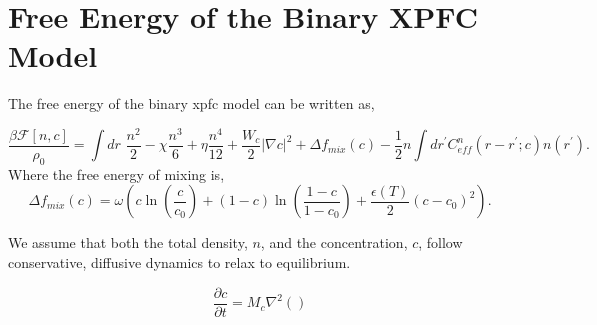 \documentclass[11pt]{article}
\begin{document}
\section*{Free Energy of the Binary XPFC Model}

The free energy of the binary xpfc model can be written as, 

\begin{equation}
\frac{\beta \mathcal{F}[n, c]}{\rho_0} = \int dr \,\, \frac{n^2}{2} - \chi\frac{n^3}{6}
 + \eta \frac{n^4}{12} + \frac{W_c}{2}\lvert\nabla c\rvert^2 + \Delta f_{mix}(c) - \frac{1}{2}n\int dr^\prime C_{eff}^n(r-r^\prime; c)n(r^\prime).
\end{equation}
Where the free energy of mixing is, 
\begin{equation}
\Delta f_{mix}(c) = \omega\left(c\ln\left(\frac{c}{c_0}\right)+(1-c)\ln\left(\frac{1-c}{1-c_0}\right) + \frac{\epsilon(T)}{2} (c-c_0)^2\right).
\end{equation}

We assume that both the total density, $n$, and the concentration, $c$, follow conservative, diffusive dynamics to relax to equilibrium. 

\begin{equation}
\frac{\partial c}{\partial t} = M_c\nabla^2\left(\right)
\end{equation}
\end{document}
